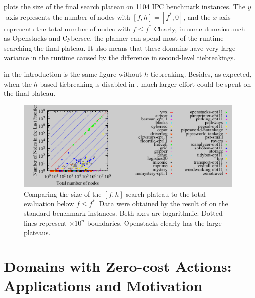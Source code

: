  plots the size of the final search plateau on 1104 IPC benchmark instances.
The $y$-axis
represents the number of nodes with $[f,h]=[f^*,0]$, and the $x$-axis represents the total
number of nodes with $f\leq f^*$ 
Clearly, in some domains such as Openstacks and Cybersec, the planner can spend most of the runtime
searching the final plateau.
It also
means that these domains have very large variance in the runtime caused
by the difference in second-level tiebreakings. 

 in the introduction is the same figure without $h$-tiebreaking.
Besides, as expected, when the
$h$-based tiebreaking is disabled in , much
larger effort could be spent on the final plateau.







\begin{figure}[htb]
 \centering {}
  \includegraphics{tables/aaai16-frontier/aaai16prelim3/lmcut_frontier-front.pdf}
  \caption{Comparing the size of the $[f,h]$ search plateau to the total
  evaluation below $f\leq f^*$. Data were obtained by the result of
  \lmcut on the standard benchmark instances. Both axes are
  logarithmic. Dotted lines represent $\times 10^n$ boundaries.
  Openstacks clearly has the large plateaus.}  \label{plateau}
\end{figure}

\section{Domains with Zero-cost Actions: Applications and Motivation}



